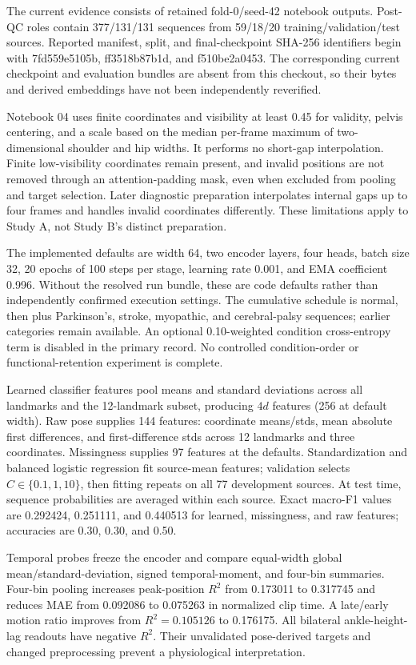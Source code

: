 \documentclass{article}
\begin{document}
The current evidence consists of retained fold-0/seed-42 notebook
outputs. Post-QC roles contain 377/131/131 sequences from 59/18/20
training/validation/test sources. Reported manifest, split, and
final-checkpoint SHA-256 identifiers begin with 7fd559e5105b,
ff3518b87b1d, and f510be2a0453. The corresponding current checkpoint and
evaluation bundles are absent from this checkout, so their bytes and
derived embeddings have not been independently reverified.

Notebook 04 uses finite coordinates and visibility at least 0.45 for
validity, pelvis centering, and a scale based on the median per-frame
maximum of two-dimensional shoulder and hip widths. It performs no
short-gap interpolation. Finite low-visibility coordinates remain
present, and invalid positions are not removed through an
attention-padding mask, even when excluded from pooling and target
selection. Later diagnostic preparation interpolates internal gaps up to
four frames and handles invalid coordinates differently. These
limitations apply to Study A, not Study B's distinct preparation.

The implemented defaults are width 64, two encoder layers, four heads,
batch size 32, 20 epochs of 100 steps per stage, learning rate 0.001,
and EMA coefficient 0.996. Without the resolved run bundle, these are
code defaults rather than independently confirmed execution settings.
The cumulative schedule is normal, then plus Parkinson's, stroke,
myopathic, and cerebral-palsy sequences; earlier categories remain
available. An optional 0.10-weighted condition cross-entropy term is
disabled in the primary record. No controlled condition-order or
functional-retention experiment is complete.

Learned classifier features pool means and standard deviations across
all landmarks and the 12-landmark subset, producing \(4d\) features (256
at default width). Raw pose supplies 144 features: coordinate
means/stds, mean absolute first differences, and first-difference stds
across 12 landmarks and three coordinates. Missingness supplies 97
features at the defaults. Standardization and balanced logistic
regression fit source-mean features; validation selects
\(C\in\{0.1,1,10\}\), then fitting repeats on all 77 development
sources. At test time, sequence probabilities are averaged within each
source. Exact macro-F1 values are 0.292424, 0.251111, and 0.440513 for
learned, missingness, and raw features; accuracies are 0.30, 0.30, and
0.50.

Temporal probes freeze the encoder and compare equal-width global
mean/standard-deviation, signed temporal-moment, and four-bin summaries.
Four-bin pooling increases peak-position \(R^2\) from 0.173011 to
0.317745 and reduces MAE from 0.092086 to 0.075263 in normalized clip
time. A late/early motion ratio improves from \(R^2=0.105126\) to
0.176175. All bilateral ankle-height-lag readouts have negative \(R^2\).
Their unvalidated pose-derived targets and changed preprocessing prevent
a physiological interpretation.
\end{document}

